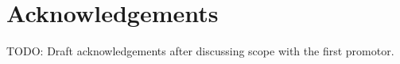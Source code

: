 \chapter{Acknowledgements}

TODO: Draft acknowledgements after discussing scope with the first promotor.

